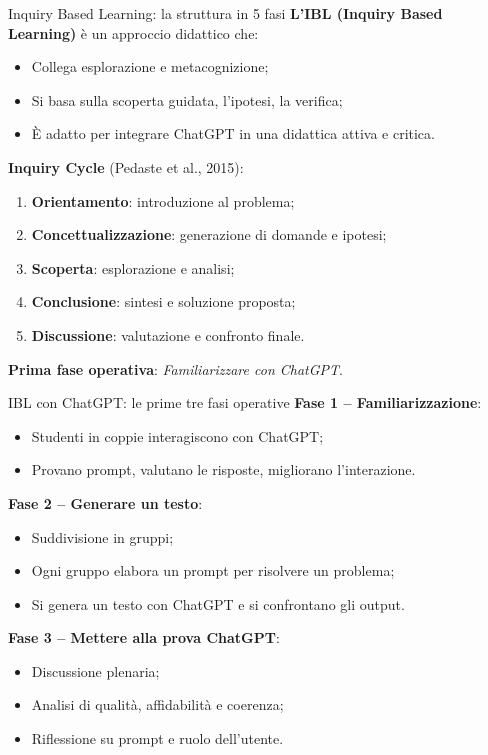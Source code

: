 \documentclass{beamer}
\begin{document}
%
%
\begin{frame}{Inquiry Based Learning: la struttura in 5 fasi}
\small
\textbf{L’IBL (Inquiry Based Learning)} è un approccio didattico che:
\begin{itemize}
    \item Collega esplorazione e metacognizione;
    \item Si basa sulla scoperta guidata, l’ipotesi, la verifica;
    \item È adatto per integrare ChatGPT in una didattica attiva e critica.
\end{itemize}

\vspace{0.3cm}
\textbf{Inquiry Cycle} (Pedaste et al., 2015):
\begin{enumerate}
    \item \textbf{Orientamento}: introduzione al problema;
    \item \textbf{Concettualizzazione}: generazione di domande e ipotesi;
    \item \textbf{Scoperta}: esplorazione e analisi;
    \item \textbf{Conclusione}: sintesi e soluzione proposta;
    \item \textbf{Discussione}: valutazione e confronto finale.
\end{enumerate}

\vspace{0.2cm}
\textbf{Prima fase operativa}: \textit{Familiarizzare con ChatGPT}.
\end{frame}
%
%
\begin{frame}{IBL con ChatGPT: le prime tre fasi operative}
\small
\textbf{Fase 1 – Familiarizzazione}:
\begin{itemize}
    \item Studenti in coppie interagiscono con ChatGPT;
    \item Provano prompt, valutano le risposte, migliorano l’interazione.
\end{itemize}

\vspace{0.2cm}
\textbf{Fase 2 – Generare un testo}:
\begin{itemize}
    \item Suddivisione in gruppi;
    \item Ogni gruppo elabora un prompt per risolvere un problema;
    \item Si genera un testo con ChatGPT e si confrontano gli output.
\end{itemize}

\vspace{0.2cm}
\textbf{Fase 3 – Mettere alla prova ChatGPT}:
\begin{itemize}
    \item Discussione plenaria;
    \item Analisi di qualità, affidabilità e coerenza;
    \item Riflessione su prompt e ruolo dell’utente.
\end{itemize}
\end{frame}
\end{document}
